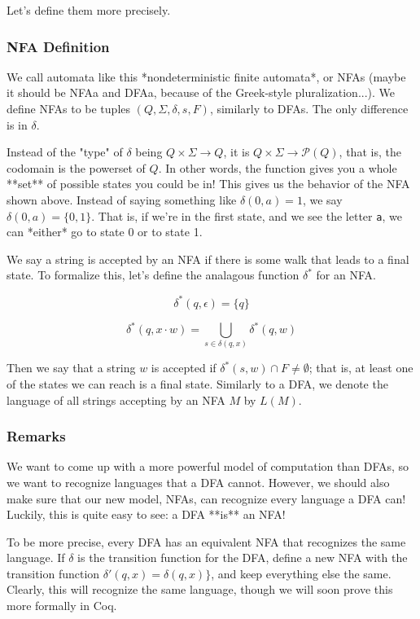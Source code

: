 Let's define them more precisely.

\subsubsection{NFA Definition}

We call automata like this *nondeterministic finite automata*, or NFAs (maybe it should be NFAa and DFAa, because of the Greek-style pluralization...).
We define NFAs to be tuples $(Q, \Sigma, \delta, s, F)$, similarly to DFAs.
The only difference is in $\delta$.

Instead of the "type" of $\delta$ being $Q \times \Sigma \rightarrow Q$, it is $Q \times \Sigma \rightarrow \mathcal{P}(Q)$, that is, the codomain is the powerset of $Q$.
In other words, the function gives you a whole **set** of possible states you could be in!
This gives us the behavior of the NFA shown above.
Instead of saying something like $\delta(0, a) = 1$, we say $\delta(0, a) = \{0,1\}$.
That is, if we're in the first state, and we see the letter \texttt{a}, we can *either* go to state 0 or to state 1.

We say a string is accepted by an NFA if there is some walk that leads to a final state.
To formalize this, let's define the analagous function $\delta^*$ for an NFA.

$$ \delta^*(q, \epsilon) = \{q\}$$

$$ \delta^*(q, x \cdot w) = \displaystyle\bigcup_{s \in \delta(q, x)} \delta^*(q, w) $$

Then we say that a string $w$ is accepted if $\delta^*(s,w) \cap F \neq \emptyset$; that is, at least one of the states we can reach is a final state.
Similarly to a DFA, we denote the language of all strings accepting by an NFA $M$ by $L(M)$.

\subsubsection{Remarks}

We want to come up with a more powerful model of computation than DFAs, so we want to recognize languages that a DFA cannot.
However, we should also make sure that our new model, NFAs, can recognize every language a DFA can!
Luckily, this is quite easy to see: a DFA **is** an NFA!

To be more precise, every DFA has an equivalent NFA that recognizes the same language.
If $\delta$ is the transition function for the DFA, define a new NFA with the transition function $\delta'(q, x) =  \delta(q,x) \}$, and keep everything else the same.
Clearly, this will recognize the same language, though we will soon prove this more formally in Coq.

